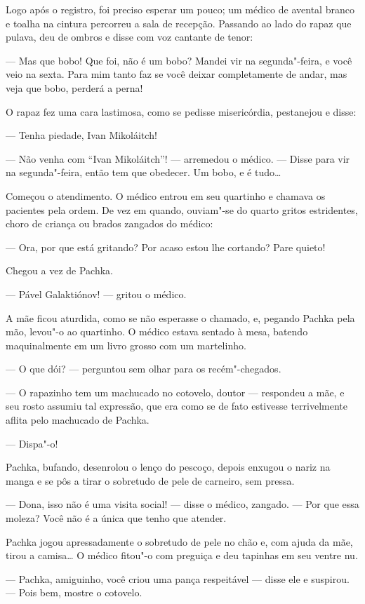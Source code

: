 Logo após o registro, foi preciso esperar um pouco; um médico de avental
branco e toalha na cintura percorreu a sala de recepção. Passando ao
lado do rapaz que pulava, deu de ombros e disse com voz cantante de
tenor:

--- Mas que bobo! Que foi, não é um bobo? Mandei vir na segunda"-feira, e
você veio na sexta. Para mim tanto faz se você deixar completamente de
andar, mas veja que bobo, perderá a perna!

O rapaz fez uma cara lastimosa, como se pedisse misericórdia, pestanejou
e disse:

--- Tenha piedade, Ivan Mikoláitch!

--- Não venha com ``Ivan Mikoláitch''! --- arremedou o médico. --- Disse
para vir na segunda"-feira, então tem que obedecer. Um bobo, e é tudo\ldots{}

Começou o atendimento. O médico entrou em seu quartinho e chamava os
pacientes pela ordem. De vez em quando, ouviam"-se do quarto gritos
estridentes, choro de criança ou brados zangados do médico:

--- Ora, por que está gritando? Por acaso estou lhe cortando? Pare
quieto!

Chegou a vez de Pachka.

--- Pável Galaktiónov! --- gritou o médico.

A mãe ficou aturdida, como se não esperasse o chamado, e, pegando Pachka
pela mão, levou"-o ao quartinho. O médico estava sentado à mesa, batendo
maquinalmente em um livro grosso com um martelinho.

--- O que dói? --- perguntou sem olhar para os recém"-chegados.

--- O rapazinho tem um machucado
no cotovelo, doutor --- respondeu a mãe, e seu rosto assumiu tal
expressão, que era como se de fato estivesse terrivelmente aflita pelo
machucado de Pachka.

--- Dispa"-o!

Pachka, bufando, desenrolou o lenço do pescoço, depois enxugou o nariz
na manga e se pôs a tirar o sobretudo de pele de carneiro, sem pressa.

--- Dona, isso não é uma visita social! --- disse o médico, zangado. ---
Por que essa moleza? Você não é a única que tenho que atender.

Pachka jogou apressadamente o sobretudo de pele no chão e, com ajuda da
mãe, tirou a camisa\ldots{} O médico fitou"-o com preguiça e deu tapinhas em
seu ventre nu.

--- Pachka, amiguinho, você criou uma pança respeitável --- disse ele e
suspirou. --- Pois bem, mostre o cotovelo.

